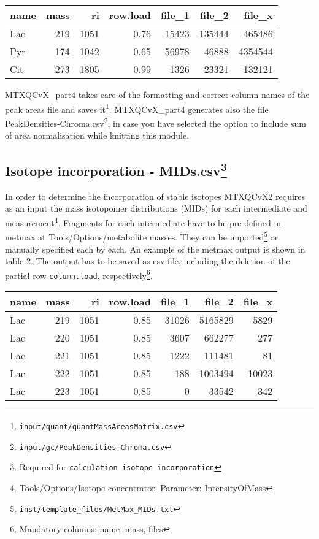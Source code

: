 \documentclass[]{book}
\let\rmarkdownfootnote\footnote%
\def\footnote{\protect\rmarkdownfootnote}
\theoremstyle{definition}
\theoremstyle{definition}
\theoremstyle{definition}
\theoremstyle{remark}
\begin{document}
\begin{tabular}{l|r|r|r|r|r|r}
\hline
name & mass & ri & row.load & file\_1 & file\_2 & file\_x\\
\hline
Lac & 219 & 1051 & 0.76 & 15423 & 135444 & 465486\\
\hline
Pyr & 174 & 1042 & 0.65 & 56978 & 46888 & 4354544\\
\hline
Cit & 273 & 1805 & 0.99 & 1326 & 23321 & 132121\\
\hline
\end{tabular}

MTXQCvX\_part4 takes care of the formatting and correct column names of
the peak areas file and saves it\footnote{\texttt{input/quant/quantMassAreasMatrix.csv}}.
MTXQCvX\_part4 generates also the file
PeakDensities-Chroma.csv\footnote{\texttt{input/gc/PeakDensities-Chroma.csv}},
in case you have selected the option to include sum of area
normalisation while knitting this module.

\subsection[Isotope incorporation - MIDs.csv]{\texorpdfstring{Isotope
incorporation - MIDs.csv\footnote{Required for
  \texttt{calculation\ isotope\ incorporation}}}{Isotope incorporation - MIDs.csv}}\label{isotope-incorporation---mids.csv}

In order to determine the incorporation of stable isotopes MTXQCvX2
requires as an input the mass isotopomer distributions (MIDs) for each
intermediate and measurement\footnote{Tools/Options/Isotope
  concentrator; Parameter: IntensityOfMass}. Fragments for each
intermediate have to be pre-defined in metmax at
Tools/Options/metabolite masses. They can be imported\footnote{\texttt{inst/template\_files/MetMax\_MIDs.txt}}
or manually specified each by each. An example of the metmax output is
shown in table 2. The output has to be saved as csv-file, including the
deletion of the partial row \texttt{column.load}, respectively\footnote{Mandatory
  columns: name, mass, files}.

\begin{tabular}{l|r|r|r|r|r|r}
\hline
name & mass & ri & row.load & file\_1 & file\_2 & file\_x\\
\hline
Lac & 219 & 1051 & 0.85 & 31026 & 5165829 & 5829\\
\hline
Lac & 220 & 1051 & 0.85 & 3607 & 662277 & 277\\
\hline
Lac & 221 & 1051 & 0.85 & 1222 & 111481 & 81\\
\hline
Lac & 222 & 1051 & 0.85 & 188 & 1003494 & 10023\\
\hline
Lac & 223 & 1051 & 0.85 & 0 & 33542 & 342\\
\hline
\end{tabular}
\end{document}

